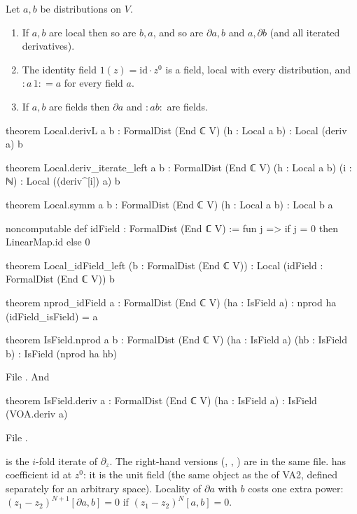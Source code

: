 \begin{proposition}\label{l03:prop:localcalc}
Let $a,b$ be distributions on $V$.
\begin{enumerate}[label=(\alph*)]
\item If $a,b$ are local then so are $b,a$, and so are $\partial a,b$ and $a,\partial b$ (and all
  iterated derivatives).
\item The identity field $1(z) = \mathrm{id}\cdot z^0$ is a field, local with every distribution,
  and ${:}a\,1{:} = a$ for every field $a$.
\item If $a,b$ are fields then $\partial a$ and ${:}ab{:}$ are fields.
\end{enumerate}
\end{proposition}
\begin{leancode}
theorem Local.derivL {a b : FormalDist (End ℂ V)} (h : Local a b) : Local (deriv a) b

theorem Local.deriv_iterate_left {a b : FormalDist (End ℂ V)} (h : Local a b) (i : ℕ) :
    Local ((deriv^[i]) a) b

theorem Local.symm {a b : FormalDist (End ℂ V)} (h : Local a b) : Local b a

noncomputable def idField : FormalDist (End ℂ V) := fun j => if j = 0 then LinearMap.id else 0

theorem Local_idField_left (b : FormalDist (End ℂ V)) :
    Local (idField : FormalDist (End ℂ V)) b

theorem nprod_idField {a : FormalDist (End ℂ V)} (ha : IsField a) :
    nprod ha (idField_isField) = a

theorem IsField.nprod {a b : FormalDist (End ℂ V)} (ha : IsField a) (hb : IsField b) :
    IsField (nprod ha hb)
\end{leancode}
File . And
\begin{leancode}
theorem IsField.deriv {a : FormalDist (End ℂ V)} (ha : IsField a) :
    IsField (VOA.deriv a)
\end{leancode}
File .

\begin{dictionary}
 is the $i$-fold iterate of $\partial_z$. The right-hand versions
(, , ) are in the same
file.  has coefficient $\mathrm{id}$ at $z^0$: it is the unit field (the same object as
the  of VA2, defined separately for an arbitrary space). Locality of $\partial a$ with $b$
costs one extra power: $(z_1-z_2)^{N+1}[\partial a,b] = 0$ if $(z_1-z_2)^N[a,b] = 0$.
\end{dictionary}

